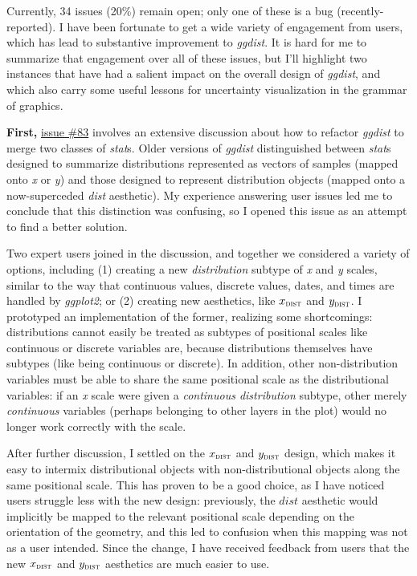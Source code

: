 \documentclass[journal]{vgtc}                     %
\begin{document}
Currently, 34 issues (20\%) remain open; only one of these is a bug (recently-reported). 
I have been fortunate to get a wide variety of engagement from users, which has lead to substantive improvement to \textit{ggdist}. It is hard for me to summarize that engagement over all of these issues, but I'll highlight two instances that have had a salient impact on the overall design of \textit{ggdist}, and which also carry some useful lessons for uncertainty visualization in the grammar of graphics.

\textbf{First,} \href{https://github.com/mjskay/ggdist/issues/83}{issue \#83} involves an extensive discussion about how to refactor \textit{ggdist} to merge two classes of \textit{stat}s. Older versions of \textit{ggdist} distinguished between \textit{stat}s designed to summarize distributions represented as vectors of samples (mapped onto \textit{x} or \textit{y}) and those designed to represent distribution objects (mapped onto a now-superceded \textit{dist} aesthetic). My experience answering user issues led me to conclude that this distinction was confusing, so I opened this issue as an attempt to find a better solution. 

Two expert users joined in the discussion, and together we considered a variety of options, including (1) creating a new \textit{distribution} subtype of \textit{x} and \textit{y} scales, similar to the way that continuous values, discrete values, dates, and times are handled by \textit{ggplot2}; or (2) creating new aesthetics, like $x_\textsc{dist}$ and $y_\textsc{dist}$. I prototyped an implementation of the former, realizing some shortcomings: distributions cannot easily be treated as subtypes of positional scales like continuous or discrete variables are, because distributions themselves have subtypes (like being continuous or discrete). In addition, other non-distribution variables must be able to share the same positional scale as the distributional variables: if an \textit{x} scale were given a \textit{continuous distribution} subtype, other merely \textit{continuous} variables (perhaps belonging to other layers in the plot) would no longer work correctly with the scale.

After further discussion, I settled on the $x_\textsc{dist}$ and $y_\textsc{dist}$ design, which makes it easy to intermix distributional objects with non-distributional objects along the same positional scale. This has proven to be a good choice, as I have noticed users struggle less with the new design: previously, the $\textit{dist}$ aesthetic would implicitly be mapped to the relevant positional scale depending on the orientation of the geometry, and this led to confusion when this mapping was not as a user intended. Since the change, I have received feedback from users that the new $x_\textsc{dist}$ and $y_\textsc{dist}$ aesthetics are much easier to use.
\end{document}

